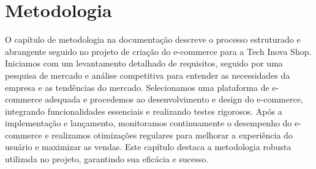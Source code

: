 \chapter{Metodologia}
\label{ch:identificador}
	\begin{resumocapitulo}
	O capítulo de metodologia na documentação descreve o processo estruturado e abrangente seguido no projeto de criação do e-commerce para a Tech Inova Shop. Iniciamos com um levantamento detalhado de requisitos, seguido por uma pesquisa de mercado e análise competitiva para entender as necessidades da empresa e as tendências do mercado. Selecionamos uma plataforma de e-commerce adequada e procedemos ao desenvolvimento e design do e-commerce, integrando funcionalidades essenciais e realizando testes rigorosos. Após a implementação e lançamento, monitoramos continuamente o desempenho do e-commerce e realizamos otimizações regulares para melhorar a experiência do usuário e maximizar as vendas. Este capítulo destaca a metodologia robusta utilizada no projeto, garantindo sua eficácia e sucesso.
	\end{resumocapitulo}

